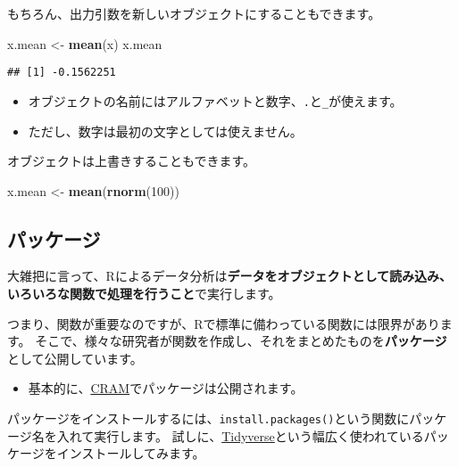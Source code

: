 \documentclass[]{bxjsarticle}
\newenvironment{Shaded}{\begin{snugshade}}{\end{snugshade}}
\newcommand{\DecValTok}[1]{\textcolor[rgb]{0.00,0.00,0.81}{#1}}
\newcommand{\KeywordTok}[1]{\textcolor[rgb]{0.13,0.29,0.53}{\textbf{#1}}}
\newcommand{\NormalTok}[1]{#1}
\newcommand{\StringTok}[1]{\textcolor[rgb]{0.31,0.60,0.02}{#1}}
\providecommand{\tightlist}{%
  \setlength{\itemsep}{0pt}\setlength{\parskip}{0pt}}
\begin{document}
もちろん、出力引数を新しいオブジェクトにすることもできます。

\begin{Shaded}
\begin{Highlighting}[]
\NormalTok{x.mean <-}\StringTok{ }\KeywordTok{mean}\NormalTok{(x)}
\NormalTok{x.mean}
\end{Highlighting}
\end{Shaded}

\begin{verbatim}
## [1] -0.1562251
\end{verbatim}

\begin{itemize}
\tightlist
\item
  オブジェクトの名前にはアルファベットと数字、\texttt{.}と\texttt{\_}が使えます。
\item
  ただし、数字は最初の文字としては使えません。
\end{itemize}

オブジェクトは上書きすることもできます。

\begin{Shaded}
\begin{Highlighting}[]
\NormalTok{x.mean <-}\StringTok{ }\KeywordTok{mean}\NormalTok{(}\KeywordTok{rnorm}\NormalTok{(}\DecValTok{100}\NormalTok{))}
\end{Highlighting}
\end{Shaded}

\hypertarget{ux30d1ux30c3ux30b1ux30fcux30b8}{%
\subsection{パッケージ}\label{ux30d1ux30c3ux30b1ux30fcux30b8}}

大雑把に言って、Rによるデータ分析は\textbf{データをオブジェクトとして読み込み、いろいろな関数で処理を行うこと}で実行します。

つまり、関数が重要なのですが、Rで標準に備わっている関数には限界があります。
そこで、様々な研究者が関数を作成し、それをまとめたものを\textbf{パッケージ}として公開しています。

\begin{itemize}
\tightlist
\item
  基本的に、\href{https://cran.r-project.org/}{CRAM}でパッケージは公開されます。
\end{itemize}

パッケージをインストールするには、\texttt{install.packages()}という関数にパッケージ名を入れて実行します。
試しに、\href{https://www.tidyverse.org/}{Tidyverse}という幅広く使われているパッケージをインストールしてみます。
\end{document}
